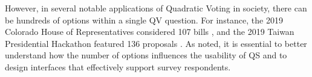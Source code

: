 However, in several notable applications of Quadratic Voting in society, there can be hundreds of options within a single QV question. For instance, the 2019 Colorado House of Representatives considered 107 bills \cite{NewWayVoting}, and the 2019 Taiwan Presidential Hackathon featured 136 proposals \cite{QuadraticVotingFrontend2022}. As \textcite{chengCanShowWhat2021} noted, it is essential to better understand how the number of options influences the usability of QS and to design interfaces that effectively support survey respondents.